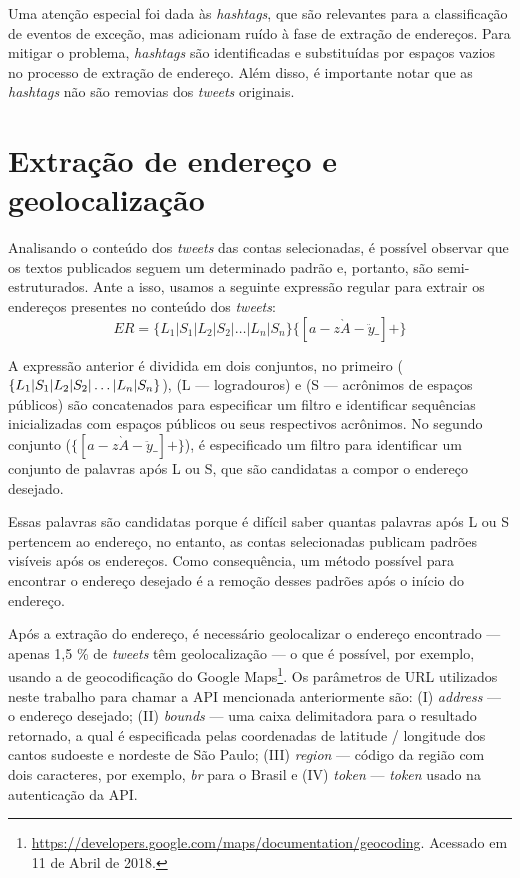 \documentclass[
	12pt,				%
	oneside,			%
	a4paper,			%
	english,			%
	brazil				%
	]{abntex2ppgsi}
\begin{document}
{{{Uma atenção especial foi dada às \textit{hashtags}, que são relevantes para a classificação de eventos de exceção, mas adicionam ruído à fase de extração de endereços. Para mitigar o problema, \textit{hashtags} são identificadas e substituídas por espaços vazios no processo de extração de endereço. Além disso, é importante notar que as \textit{hashtags} não são removias dos \textit{tweets} originais.

\section{Extração de endereço e geolocalização}

Analisando o conteúdo dos \textit{tweets} das contas selecionadas, é possível observar que os textos publicados seguem um determinado padrão e, portanto, são semi-estruturados. Ante a isso, usamos a seguinte expressão regular para extrair os endereços presentes no conteúdo dos \textit{tweets}:
%
\begin{equation}
ER = \lbrace L_1 | S_1 | L_2 | S_2 | \dots | L_n | S_n \rbrace \lbrace [a-z\grave{A}-\ddot{y}\_] + \rbrace
\end{equation}

A expressão anterior é dividida em dois conjuntos, no primeiro ($\lbrace L_1 | S_1 | L_2 | S_2 | \newline \dots | L_n | S_n \rbrace $), (L --- logradouros) e (S --- acrônimos de espaços públicos) são concatenados para especificar um filtro e identificar sequências inicializadas com espaços públicos ou seus respectivos acrônimos. No segundo conjunto ($\lbrace [a-z\grave{A}-\ddot{y}\_] + \rbrace $), é especificado um filtro para identificar um conjunto de palavras após L ou S, que são candidatas a compor o endereço desejado.

Essas palavras são candidatas porque é difícil saber quantas palavras após L ou S pertencem ao endereço, no entanto, as contas selecionadas publicam padrões visíveis após os endereços. Como consequência, um método possível para encontrar o endereço desejado é a remoção desses padrões após o início do endereço.

Após a extração do endereço, é necessário geolocalizar o endereço encontrado --- apenas 1,5 \% de \textit {tweets} têm geolocalização \cite{niu2016community} --- o que é possível, por exemplo, usando a  de geocodificação do Google Maps\footnote {\url {https://developers.google.com/maps/documentation/geocoding}. Acessado em 11 de Abril de 2018.}. Os parâmetros de URL utilizados neste trabalho para chamar a API mencionada anteriormente são: (I) \emph {address} --- o endereço desejado; (II) \emph {bounds} --- uma caixa delimitadora para o resultado retornado, a qual é especificada pelas coordenadas de latitude / longitude dos cantos sudoeste e nordeste de São Paulo; (III) \emph {region} --- código da região com dois caracteres, por exemplo, \textit{br} para o Brasil e (IV) \emph {token} --- \textit{token} usado na autenticação da API.

}}}
\end{document}
